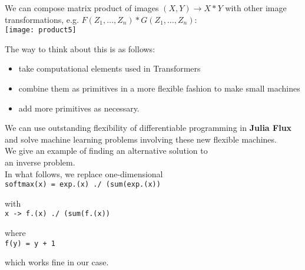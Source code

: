 \documentclass{beamer}
\begin{document}
\begin{frame}

We can compose matrix product of images $(X,Y) \rightarrow X*Y$ with other image transformations, 
e.g. $F(Z_1, \dots, Z_n)*G(Z_1, \dots, Z_n)$:\\[2ex]

\texttt{[image: product5]}

The way to think about this is as follows:\\[2ex]

\begin{itemize} 
     \item take computational elements used in Transformers
     \item combine them as primitives in a more flexible fashion to make small machines
     \item add more primitives as necessary.
\end{itemize}

\end{frame}

\begin{frame}

We can use outstanding flexibility of differentiable programming in {\bf Julia Flux} and solve machine learning problems
involving these new flexible machines.\\[2ex]

We give an example of finding an alternative solution to\\ an inverse problem.\\[4ex]

In what follows, we replace one-dimensional\\[1ex]

{\footnotesize\tt softmax(x) = exp.(x) ./ (sum(exp.(x))\\[1ex]}

with\\[1ex]

{\footnotesize\tt x -> f.(x) ./ (sum(f.(x))\\[1ex]}

where\\[1ex]

{\footnotesize\tt f(y) = y + 1\\[1ex]}

which works fine in our case.

\end{frame}
\end{document}
